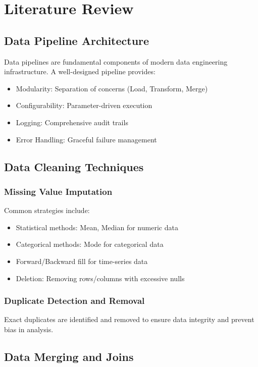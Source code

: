 \documentclass[12pt,a4paper]{report}
\begin{document}
\chapter{Literature Review}

\section{Data Pipeline Architecture}

Data pipelines are fundamental components of modern data engineering infrastructure. A well-designed pipeline provides:
\begin{itemize}
    \item Modularity: Separation of concerns (Load, Transform, Merge)
    \item Configurability: Parameter-driven execution
    \item Logging: Comprehensive audit trails
    \item Error Handling: Graceful failure management
\end{itemize}

\section{Data Cleaning Techniques}

\subsection{Missing Value Imputation}

Common strategies include:
\begin{itemize}
    \item Statistical methods: Mean, Median for numeric data
    \item Categorical methods: Mode for categorical data
    \item Forward/Backward fill for time-series data
    \item Deletion: Removing rows/columns with excessive nulls
\end{itemize}

\subsection{Duplicate Detection and Removal}

Exact duplicates are identified and removed to ensure data integrity and prevent bias in analysis.

\section{Data Merging and Joins}
\end{document}
